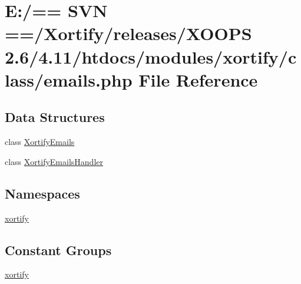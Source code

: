 \hypertarget{emails_8php}{\section{E\-:/== S\-V\-N ==/\-Xortify/releases/\-X\-O\-O\-P\-S 2.6/4.11/htdocs/modules/xortify/class/emails.php File Reference}
\label{emails_8php}
}
\subsection*{Data Structures}
\begin{DoxyCompactItemize}
\item 
class \hyperlink{class_xortify_emails}{Xortify\-Emails}
\item 
class \hyperlink{class_xortify_emails_handler}{Xortify\-Emails\-Handler}
\end{DoxyCompactItemize}
\subsection*{Namespaces}
\begin{DoxyCompactItemize}
\item 
\hyperlink{namespacexortify}{xortify}
\end{DoxyCompactItemize}
\subsection*{Constant Groups}
\begin{DoxyCompactItemize}
\item 
\hyperlink{namespacexortify}{xortify}
\end{DoxyCompactItemize}
